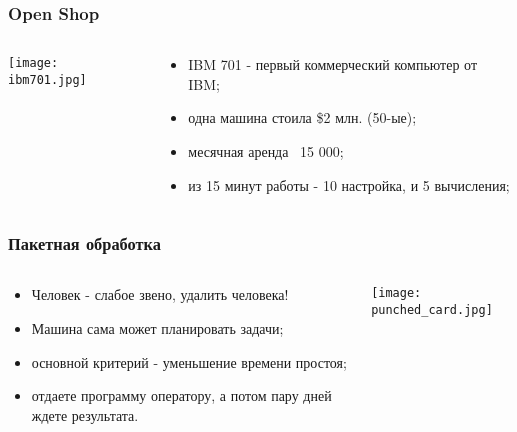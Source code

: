 \begin{frame}
\frametitle{Open Shop}
\begin{columns}
  \begin{column}{0.5\textwidth}
    \begin{center}
    \texttt{[image: ibm701.jpg]}
    \end{center}
  \end{column}
  \begin{column}{0.5\textwidth}
    \begin{itemize}
      \item IBM 701 - первый коммерческий компьютер от IBM;
      \item одна машина стоила \$2 млн. (50-ые)\footnotemark[1];
      \item месячная аренда ~15 000;
      \item из 15 минут работы - 10 настройка, и 5 вычисления;
    \end{itemize}
  \end{column}
\end{columns}
\end{frame}

\begin{frame}
\frametitle{Пакетная обработка}
\begin{columns}
  \begin{column}{0.5\textwidth}
    \begin{itemize}
      \item Человек - слабое звено, удалить человека!
      \item Машина сама может планировать задачи;
      \item основной критерий - уменьшение времени простоя;
      \item отдаете программу оператору, а потом пару дней ждете результата.
    \end{itemize}
  \end{column}
  \begin{column}{0.5\textwidth}
    \begin{center}
    \texttt{[image: punched\_card.jpg]}
    \end{center}
  \end{column}
\end{columns}
\end{frame}


